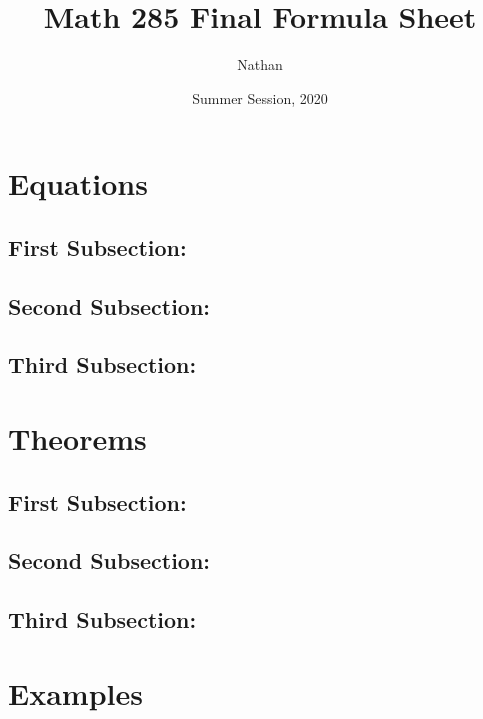 \documentclass{article}
\title{Math 285 Final Formula Sheet}
\author{Nathan}
\date{Summer Session, 2020}
\begin{document}
\maketitle

\section*{Equations}

\subsection*{First Subsection:}
\setcounter{equation}{0}



\subsection*{Second Subsection:}
\setcounter{equation}{0}



\subsection*{Third Subsection:}
\setcounter{equation}{0}





\section*{Theorems}

\subsection*{First Subsection:}
\setcounter{equation}{0}



\subsection*{Second Subsection:}
\setcounter{equation}{0}



\subsection*{Third Subsection:}
\setcounter{equation}{0}





\section*{Examples}
\end{document}
